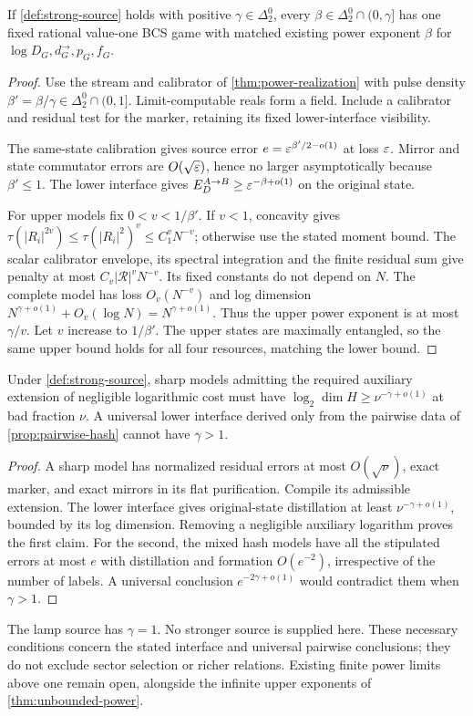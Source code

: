\begin{theorem}\label{thm:strong-source-transfer}
If \cref{def:strong-source} holds with positive $\gamma\in\Delta^0_2$, every $\beta\in\Delta^0_2\cap(0,\gamma]$ has one fixed rational value-one BCS game with matched existing power exponent $\beta$ for $\log D_G,d_G^\to,p_G,f_G$.
\end{theorem}
\begin{proof}
Use the stream and calibrator of \cref{thm:power-realization} with pulse density $\beta'=\beta/\gamma\in\Delta^0_2\cap(0,1]$. Limit-computable reals form a field. Include a calibrator and residual test for the marker, retaining its fixed lower-interface visibility.

The same-state calibration gives source error $e=\varepsilon^{\beta'/2-o(1)}$ at loss $\varepsilon$. Mirror and state commutator errors are $O(\sqrt{\varepsilon})$, hence no larger asymptotically because $\beta'\le1$. The lower interface gives $E_D^{A\to B}\ge\varepsilon^{-\beta+o(1)}$ on the original state.

For upper models fix $0<v<1/\beta'$. If $v<1$, concavity gives $\tau(|R_i|^{2v})\le\tau(|R_i|^2)^v\le C_1^vN^{-v}$; otherwise use the stated moment bound. The scalar calibrator envelope, its spectral integration and the finite residual sum give penalty at most $C_v|\mathcal R|^vN^{-v}$. Its fixed constants do not depend on $N$. The complete model has loss $O_v(N^{-v})$ and log dimension $N^{\gamma+o(1)}+O_v(\log N)=N^{\gamma+o(1)}$. Thus the upper power exponent is at most $\gamma/v$. Let $v$ increase to $1/\beta'$. The upper states are maximally entangled, so the same upper bound holds for all four resources, matching the lower bound.
\end{proof}

\begin{proposition}\label{prop:strong-source-necessary}
Under \cref{def:strong-source}, sharp models admitting the required auxiliary extension of negligible logarithmic cost must have $\log_2\dim H\ge\nu^{-\gamma+o(1)}$ at bad fraction $\nu$. A universal lower interface derived only from the pairwise data of \cref{prop:pairwise-hash} cannot have $\gamma>1$.
\end{proposition}
\begin{proof}
A sharp model has normalized residual errors at most $O(\sqrt\nu)$, exact marker, and exact mirrors in its flat purification. Compile its admissible extension. The lower interface gives original-state distillation at least $\nu^{-\gamma+o(1)}$, bounded by its log dimension. Removing a negligible auxiliary logarithm proves the first claim. For the second, the mixed hash models have all the stipulated errors at most $e$ with distillation and formation $O(e^{-2})$, irrespective of the number of labels. A universal conclusion $e^{-2\gamma+o(1)}$ would contradict them when $\gamma>1$.
\end{proof}

The lamp source has $\gamma=1$. No stronger source is supplied here. These necessary conditions concern the stated interface and universal pairwise conclusions; they do not exclude sector selection or richer relations. Existing finite power limits above one remain open, alongside the infinite upper exponents of \cref{thm:unbounded-power}.
